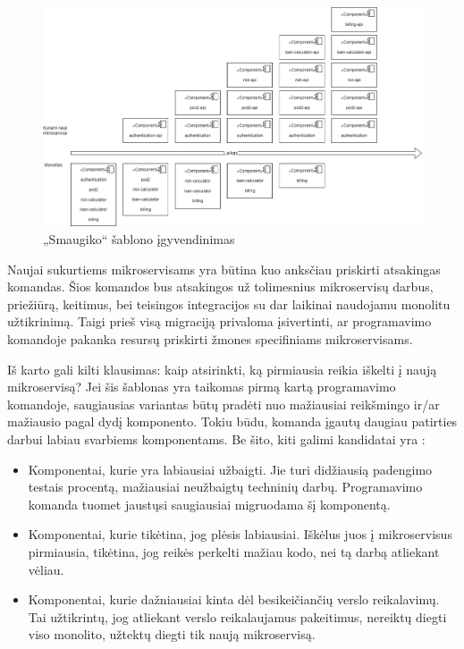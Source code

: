 \documentclass{VUMIFPSbakalaurinis}
\begin{document}
\begin{figure}[H]
    \centering
    \includegraphics{img/smaugiko-sablonas.png}
    \caption{„Smaugiko“ šablono įgyvendinimas}
    \label{img:smaugiko-sablonas}
\end{figure}

Naujai sukurtiems mikroservisams yra būtina kuo anksčiau priskirti atsakingas komandas. Šios komandos bus atsakingos už tolimesnius mikroservisų darbus, priežiūrą, keitimus, bei teisingos integracijos su dar laikinai naudojamu monolitu užtikrinimą. Taigi prieš visą migraciją privaloma įsivertinti, ar programavimo komandoje pakanka resursų priskirti žmones specifiniams mikroservisams.

Iš karto gali kilti klausimas: kaip atsirinkti, ką pirmiausia reikia iškelti į naują mikroservisą? Jei šis šablonas yra taikomas pirmą kartą programavimo komandoje, saugiausias variantas būtų pradėti nuo mažiausiai reikšmingo ir/ar mažiausio pagal dydį komponento. Tokiu būdu, komanda įgautų daugiau patirties darbui labiau svarbiems komponentams. Be šito, kiti galimi kandidatai yra \cite{Beh18}:
\begin{itemize}
    \item Komponentai, kurie yra labiausiai užbaigti. Jie turi didžiausią padengimo testais procentą, mažiausiai neužbaigtų techninių darbų. Programavimo komanda tuomet jaustųsi saugiausiai migruodama šį komponentą.
    
    \item Komponentai, kurie tikėtina, jog plėsis labiausiai. Iškėlus juos į mikroservisus pirmiausia, tikėtina, jog reikės perkelti mažiau kodo, nei tą darbą atliekant vėliau.
    
    \item Komponentai, kurie dažniausiai kinta dėl besikeičiančių verslo reikalavimų. Tai užtikrintų, jog atliekant verslo reikalaujamus pakeitimus, nereiktų diegti viso monolito, užtektų diegti tik naują mikroservisą.\\
\end{itemize}
\end{document}
